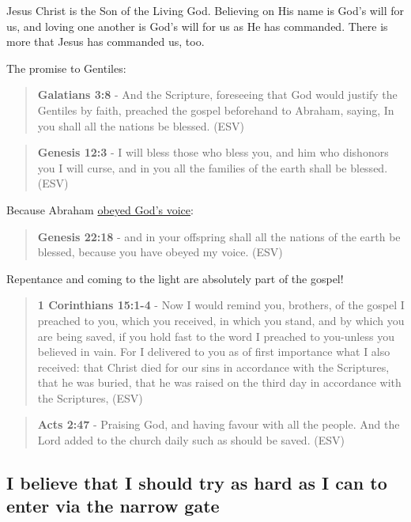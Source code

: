 \documentclass[11pt]{article}
\begin{document}
Jesus Christ is the Son of the Living God. Believing on His name is God's will for us, and loving one another is God's will for us as He has commanded. There is more that Jesus has commanded us, too.

The promise to Gentiles:

\begin{quote}
\textbf{Galatians 3:8} - And the Scripture, foreseeing that God would justify the Gentiles by faith, preached the gospel beforehand to Abraham, saying, In you shall all the nations be blessed. (ESV)
\end{quote}

\begin{quote}
\textbf{Genesis 12:3} - I will bless those who bless you, and him who dishonors you I will curse, and in you all the families of the earth shall be blessed. (ESV)
\end{quote}

Because Abraham \uline{obeyed God's voice}:

\begin{quote}
\textbf{Genesis 22:18} - and in your offspring shall all the nations of the earth be blessed, because you have obeyed my voice. (ESV)
\end{quote}

Repentance and coming to the light are absolutely part of the gospel!

\begin{quote}
\textbf{1 Corinthians 15:1-4} -  Now I would remind you, brothers, of the gospel I preached to you, which you received, in which you stand, and by which you are being saved, if you hold fast to the word I preached to you-unless you believed in vain.  For I delivered to you as of first importance what I also received: that Christ died for our sins in accordance with the Scriptures, that he was buried, that he was raised on the third day in accordance with the Scriptures,  (ESV)
\end{quote}

\begin{quote}
\textbf{Acts 2:47} - Praising God, and having favour with all the people. And the Lord added to the church daily such as should be saved. (ESV)
\end{quote}

\subsection{I believe that I should try as hard as I can to enter via the narrow gate}
\label{sec:orge11003a}
\end{document}
